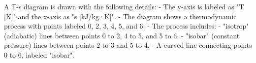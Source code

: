 A T-s diagram is drawn with the following details:  
- The y-axis is labeled as "T [K]" and the x-axis as "s [kJ/kg·K]".  
- The diagram shows a thermodynamic process with points labeled 0, 2, 3, 4, 5, and 6.  
- The process includes:  
  - "isotrop" (adiabatic) lines between points 0 to 2, 4 to 5, and 5 to 6.  
  - "isobar" (constant pressure) lines between points 2 to 3 and 5 to 4.  
  - A curved line connecting points 0 to 6, labeled "isobar".
